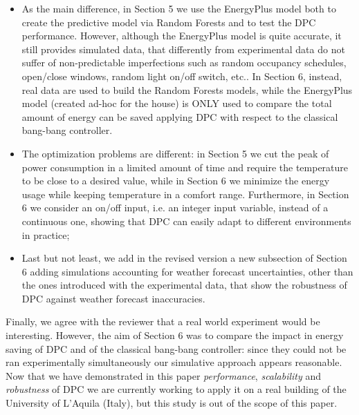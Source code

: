 \documentclass{article}
\begin{document}
\begin{enumerate}
\begin{itemize}
	\item As the main difference, in Section 5 we use the EnergyPlus model both to create the predictive model via Random Forests and to test the DPC performance. However, although the EnergyPlus model is quite accurate, it still provides simulated data, that differently from experimental data do not suffer of non-predictable imperfections such as random occupancy schedules, open/close windows, random light on/off switch, etc.. In Section 6, instead, real data are used to build the Random Forests models, while the EnergyPlus model (created ad-hoc for the house) is ONLY used to compare the total amount of energy can be saved applying DPC with respect to the classical bang-bang controller.

	\item The optimization problems are different: in Section 5 we cut the peak of power consumption in a limited amount of time and require the temperature to be close to a desired value, while in Section 6 we minimize the energy usage while keeping temperature in a comfort range. Furthermore, in Section 6 we consider an on/off input, i.e. an integer input variable, instead of a continuous one, showing that  DPC can easily adapt to different environments in practice;
	\item Last but not least, we add in the revised version a new subsection of Section 6 adding simulations accounting for weather forecast uncertainties, other than the ones introduced with the experimental data, that show the robustness of DPC against weather forecast inaccuracies.

\end{itemize}
Finally, we agree with the reviewer that a real world experiment would be interesting. However, the aim of Section 6 was to compare the impact in energy saving of DPC and of the classical bang-bang controller: since they could not be ran experimentally simultaneously our simulative approach appears reasonable. Now that we have demonstrated in this paper \textit{performance}, \textit{scalability} and \textit{robustness} of DPC we are currently working to apply it on a real building of the University of L'Aquila (Italy), but this study is out of the scope of this paper.

\end{enumerate}
\end{document}

